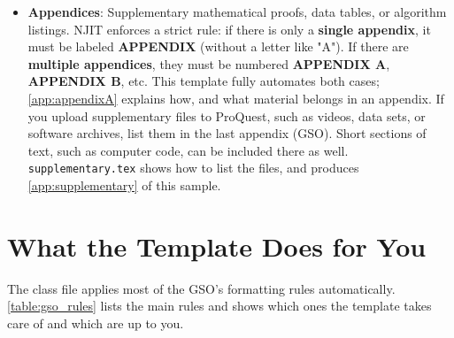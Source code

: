 \begin{itemize}
\item \textbf{Appendices}: Supplementary mathematical proofs, data tables, or algorithm listings. NJIT enforces a strict rule: if there is only a \textbf{single appendix}, it must be labeled \textbf{APPENDIX} (without a letter like "A"). If there are \textbf{multiple appendices}, they must be numbered \textbf{APPENDIX A}, \textbf{APPENDIX B}, etc. This template fully automates both cases; \cref{app:appendixA} explains how, and what material belongs in an appendix. If you upload supplementary files to ProQuest, such as videos, data sets, or software archives, list them in the last appendix (GSO). Short sections of text, such as computer code, can be included there as well. \texttt{supplementary.tex} shows how to list the files, and produces \cref{app:supplementary} of this sample.
\end{itemize}

\section{What the Template Does for You}
\label{sec:template-does}

The class file applies most of the GSO's formatting rules automatically. \cref{table:gso_rules} lists the main rules and shows which ones the template takes care of and which are up to you.


